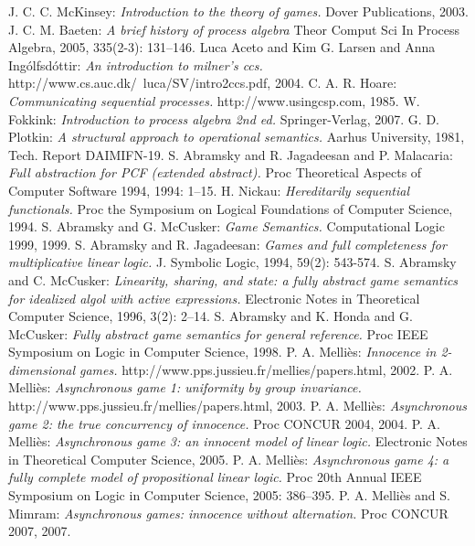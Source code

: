 \documentclass{fac}
\begin{document}
\begin{thebibliography}{Lam94}
   J. C. C. McKinsey: \emph{Introduction to the theory of games.} Dover Publications, 2003.
   J. C. M. Baeten: \emph{A brief history of process algebra} Theor Comput Sci In Process Algebra, 2005, 335(2-3): 131--146.
   Luca Aceto and Kim G. Larsen and Anna Ing\'{o}lfsd\'{o}ttir: \emph{An introduction to milner's ccs.} http://www.cs.auc.dk/~luca/SV/intro2ccs.pdf, 2004.
   C. A. R. Hoare: \emph{Communicating sequential processes.} http://www.usingcsp.com, 1985.
   W. Fokkink: \emph{Introduction to process algebra 2nd ed.} Springer-Verlag, 2007.
   G. D. Plotkin: \emph{A structural approach to operational semantics.} Aarhus University, 1981, Tech. Report DAIMIFN-19.
   S. Abramsky and R. Jagadeesan and P. Malacaria: \emph{Full abstraction for PCF (extended abstract).} Proc Theoretical Aspects of Computer Software 1994, 1994: 1--15.
   H. Nickau: \emph{Hereditarily sequential functionals.} Proc the Symposium on Logical Foundations of Computer Science, 1994.
   S. Abramsky and G. McCusker: \emph{Game Semantics.} Computational Logic 1999, 1999.
   S. Abramsky and R. Jagadeesan: \emph{Games and full completeness for multiplicative linear logic.} J. Symbolic Logic, 1994, 59(2): 543-574.
   S. Abramsky and C. McCusker: \emph{Linearity, sharing, and state: a fully abstract game semantics for idealized algol with active expressions.} Electronic Notes in Theoretical Computer Science, 1996, 3(2): 2--14.
   S. Abramsky and K. Honda and G. McCusker: \emph{Fully abstract game semantics for general reference.} Proc IEEE Symposium on Logic in Computer Science, 1998.
   P. A. Melli\`{e}s: \emph{Innocence in 2-dimensional games.} http://www.pps.jussieu.fr/mellies/papers.html, 2002.
   P. A. Melli\`{e}s: \emph{Asynchronous game 1: uniformity by group invariance.} http://www.pps.jussieu.fr/mellies/papers.html, 2003.
   P. A. Melli\`{e}s: \emph{Asynchronous game 2: the true concurrency of innocence.} Proc CONCUR 2004, 2004.
   P. A. Melli\`{e}s: \emph{Asynchronous game 3: an innocent model of linear logic.} Electronic Notes in Theoretical Computer Science, 2005.
   P. A. Melli\`{e}s: \emph{Asynchronous game 4: a fully complete model of propositional linear logic.} Proc 20th Annual IEEE Symposium on Logic in Computer Science, 2005: 386--395.
   P. A. Melli\`{e}s and S. Mimram: \emph{Asynchronous games: innocence without alternation.} Proc CONCUR 2007, 2007.

\end{thebibliography}
\end{document}
